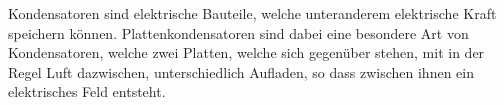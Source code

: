 \documentclass{article}
\begin{document}
Kondensatoren sind elektrische Bauteile, welche unteranderem elektrische Kraft speichern können.
Plattenkondensatoren sind dabei eine besondere Art von Kondensatoren, welche zwei Platten, welche sich gegenüber stehen, mit in der Regel Luft dazwischen, unterschiedlich Aufladen, so dass zwischen ihnen ein elektrisches Feld entsteht.
\end{document}
